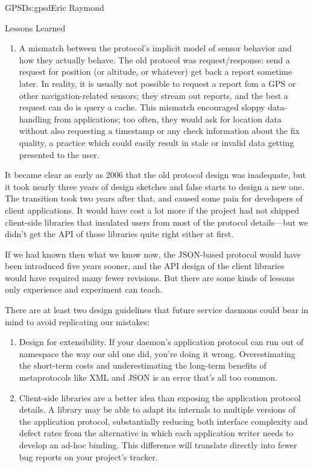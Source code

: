 \begin{aosachapter}{GPSD}{s:gpsd}{Eric Raymond}
\begin{aosasect1}{Lessons Learned}
\begin{enumerate}
  \item A mismatch between the protocol's implicit model of sensor
    behavior and how they actually behave.  The old protocol was
    request/response: send a request for position (or altitude, or
    whatever) get back a report sometime later. In reality, it is
    usually not possible to request a report fom a GPS or other
    navigation-related sensors; they stream out reports, and the best
    a request can do is query a cache.  This mismatch encouraged
    sloppy data-handling from applications; too often, they would ask
    for location data without also requesting a timestamp or any check
    information about the fix quality, a practice which could easily
    result in stale or invalid data getting presented to the user.

\end{enumerate}

It became clear as early as 2006 that the old protocol design was
inadequate, but it took nearly three years of design sketches and 
false starts to design a new one.  The transition took two years
after that, and caused some pain for developers of client applications.
It would have cost a lot more if the project had not shipped client-side
libraries that insulated users from most of the protocol details---but
we didn't get the API of those libraries quite right either at first.

If we had known then what we know now, the JSON-based protocol would
have been introduced five years sooner, and the API design of the
client libraries would have required many fewer revisions. But there
are some kinds of lessons only experience and experiment can teach.

There are at least two design guidelines that future service daemons
could bear in mind to avoid replicating our mistakes:

\begin{enumerate}

  \item Design for extensibility.  If your daemon's application
    protocol can run out of namespace the way our old one did, you're
    doing it wrong. Overestimating the short-term costs and
    underestimating the long-term benefits of metaprotocols like XML
    and JSON is an error that's all too common.

  \item Client-side libraries are a better idea than exposing the
    application protocol details. A library may be able to adapt its
    internals to multiple versions of the application protocol,
    substantially reducing both interface complexity and defect rates
    from the alternative in which each application writer needs to
    develop an ad-hoc binding.  This difference will translate
    directly into fewer bug reports on your project's tracker.


\end{enumerate}
\end{aosasect1}
\end{aosachapter}
